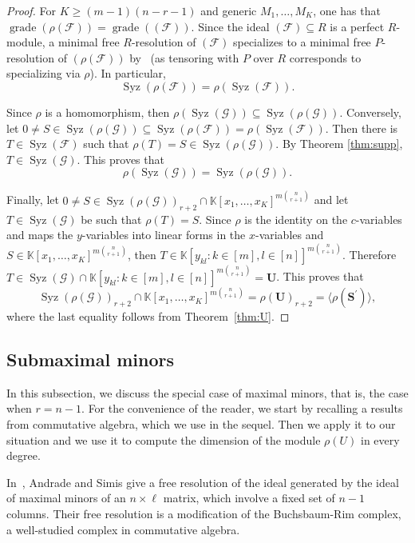 \documentclass[utf8,latin1]{article}
\DeclareMathOperator{\Syz}{Syz}
\DeclareMathOperator{\grade}{grade}
\begin{document}
\begin{proof}
For $K\geq (m-1)(n-r-1)$ and generic $M_1,\ldots,M_K$, one has that $\grade(\rho(\mathcal{F}))=\grade((\mathcal{F}))$. Since the ideal $(\mathcal{F})\subseteq R$ is a perfect $R$-module, a minimal free $R$-resolution of $(\mathcal{F})$ specializes to a minimal free $P$-resolution of $(\rho(\mathcal{F}))$ by~\cite[Theorem 3.5]{BV88} (as tensoring with $P$ over $R$ corresponds to specializing via $\rho$).
In particular, $$ \Syz(\rho(\mathcal{F}))=\rho(\Syz(\mathcal{F})).$$ 

Since $\rho$ is a homomorphism, then $\rho(\Syz(\mathcal{G}))\subseteq\Syz(\rho(\mathcal{G}))$. Conversely, let  $0\neq S\in\Syz(\rho(\mathcal{G}))\subseteq\Syz(\rho(\mathcal{F}))=\rho(\Syz(\mathcal{F}))$. Then there is $T\in\Syz(\mathcal{F})$ such that $\rho(T)=S\in\Syz(\rho(\mathcal{G}))$. By Theorem \ref{thm:supp}, $T\in\Syz(\mathcal{G})$. This proves that 
$$\rho(\Syz(\mathcal{G}))=\Syz(\rho(\mathcal{G})).$$

Finally, let $0\neq S\in\Syz(\rho(\mathcal{G}))_{r+2}\cap\mathbb{K}[x_1,\ldots,x_K]^{m\binom{n}{r+1}}$ and let $T\in\Syz(\mathcal{G})$ be such that $\rho(T)=S$. Since $\rho$ is the identity on the $c$-variables and maps the $y$-variables into linear forms in the $x$-variables and $S\in\mathbb{K}[x_1,\ldots,x_K]^{m\binom{n}{r+1}}$, then $T\in\mathbb{K}[y_{kl}: k\in[m], l\in[n]]^{m\binom{n}{r+1}}$. Therefore $T\in\Syz(\mathcal{G})\cap\mathbb{K}[y_{kl}: k\in[m], l\in[n]]^{m\binom{n}{r+1}}=\mathbf{U}$. This proves that $$\Syz(\rho(\mathcal{G}))_{r+2} \cap\mathbb{K}[x_1,\ldots,x_K]^{m\binom{n}{r+1}}=\rho(\mathbf{U})_{r+2}= \langle\rho(\mathbf{S}^\prime) \rangle,$$
where the last equality follows from Theorem~\ref{thm:U}.
\end{proof}

\subsection{Submaximal minors}

In this subsection, we discuss the special case of maximal minors, that is, the case when $r=n-1$. For the convenience of the reader, we start by recalling a results from commutative algebra, which we use in the sequel. Then we apply it to our situation and we use it to compute the dimension of the module $\rho(U)$ in every degree.

In~\cite{AS81}, Andrade and Simis give a free resolution of the ideal generated by the ideal of maximal minors of an $n\times\ell$ matrix, which involve a fixed set of $n-1$ columns.
Their free resolution is a modification of the Buchsbaum-Rim complex, a well-studied complex in commutative algebra.   
  
\end{document}
